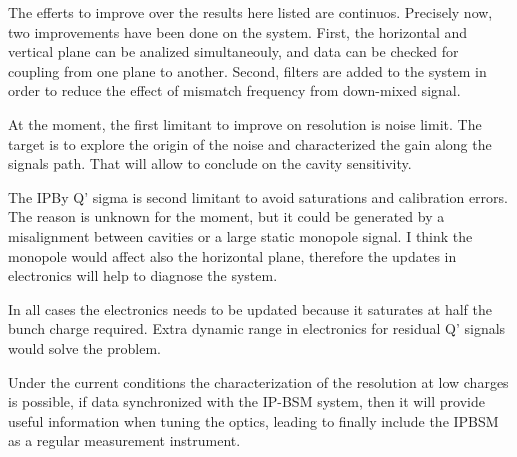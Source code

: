 The efferts to improve over the results here listed are continuos. Precisely now, two improvements have been done on the system. First, the horizontal and vertical plane can be analized simultaneouly, and data can be checked for coupling from one plane to another. Second, filters are added to the system in order to reduce the effect of mismatch frequency from down-mixed signal.\par
At the moment, the first limitant to improve on resolution is noise limit. The target is to explore the origin of the noise and characterized the gain along the signals path. That will allow to conclude on the cavity sensitivity.\par
The IPBy Q' sigma is second limitant to avoid saturations and calibration errors. The reason is unknown for the moment, but it could be generated by a misalignment between cavities or a large static monopole signal. I think the monopole would affect also the horizontal plane, therefore the updates in electronics will help to diagnose the system.\par
In all cases the electronics needs to be updated because it saturates at half the bunch charge required. Extra dynamic range in electronics for residual Q' signals would solve the problem.\par
Under the current conditions the characterization of the resolution at low charges is possible, if data synchronized with the IP-BSM system, then it will provide useful information when tuning the optics, leading to finally include the IPBSM as a regular measurement instrument.\par




